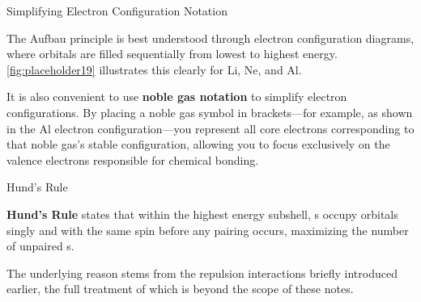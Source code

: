 \documentclass[10pt]{article}
\begin{document}
    \begin{core}{Simplifying Electron Configuration Notation}

      The Aufbau principle is best understood through electron configuration diagrams, where orbitals are filled sequentially from lowest to highest energy. \autoref{fig:placeholder19} illustrates this clearly for Li, Ne, and Al.

      It is also convenient to use \textbf{noble gas notation} to simplify electron configurations. By placing a noble gas symbol in brackets---for example, \ce{[Ne]} as shown in the Al electron configuration---you represent all core electrons corresponding to that noble gas's stable configuration, allowing you to focus exclusively on the valence electrons responsible for chemical bonding.


    \end{core}

    \begin{core}{Hund's Rule}

      \textbf{Hund's Rule} states that within the highest energy subshell, s occupy orbitals singly and with the same spin before any pairing occurs, maximizing the number of unpaired s.


      The underlying reason stems from the   repulsion interactions briefly introduced earlier, the full treatment of which is beyond the scope of these notes.

    \end{core}
\end{document}
